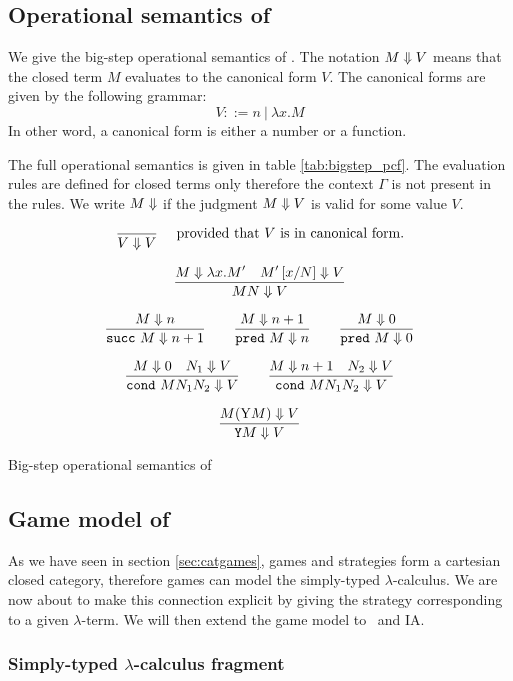 \subsection{Operational semantics of \pcf}

We give the big-step operational semantics of \pcf. The notation $M \Downarrow V$ means
that the closed term $M$ evaluates to the canonical form $V$. The canonical forms are given by the following
grammar:
$$V ::= n\ |\ \lambda x. M$$
In other word, a canonical form is either a number or a function.

The full operational semantics is given in table
\ref{tab:bigstep_pcf}. The evaluation rules are defined for closed
terms only therefore the context $\Gamma$ is not present in the
rules. We write $M \Downarrow$ if the judgment $M \Downarrow V$ is valid for some value $V$.

\begin{table}[htbp]
$$\frac{\displaystyle }{V \Downarrow V} \quad \mbox{ provided that $V$ is in canonical form.} $$

$$ \frac{\displaystyle M \Downarrow \lambda x. M' \quad M'\left[ x/N \right] \Downarrow V}{M N \Downarrow V}$$

$$\frac{\displaystyle M \Downarrow n}{\texttt{succ}\ M \Downarrow n+1}
\qquad \frac{\displaystyle M \Downarrow n+1}{\texttt{pred}\ M \Downarrow n}
\qquad \frac{\displaystyle M \Downarrow 0}{\texttt{pred}\ M \Downarrow 0}$$

$$\frac{\displaystyle M \Downarrow 0 \quad N_1 \Downarrow V}{\texttt{cond}\ M N_1 N_2  \Downarrow V}
\qquad
 \frac{\displaystyle M \Downarrow n+1 \quad N_2 \Downarrow V}{\texttt{cond}\ M N_1 N_2  \Downarrow V}$$

$$\frac{\displaystyle M (\mathrm{Y} M) \Downarrow V }{\texttt{Y} M \Downarrow V}$$
\label{tab:bigstep_pcf}
\caption{Big-step operational semantics of \pcf}
\end{table}



\subsection{Game model of \pcf}
\label{subsec:pcfgamemodel}

As we have seen in section \ref{sec:catgames}, games and strategies
form a cartesian closed category, therefore games can model the
simply-typed $\lambda$-calculus. We are now about to make this
connection explicit by giving the strategy corresponding
to a given $\lambda$-term. We will then extend the game model to \pcf\ and IA.

\subsubsection{Simply-typed $\lambda$-calculus fragment}

